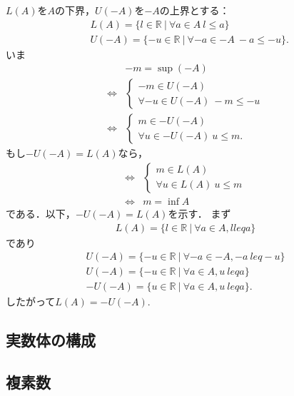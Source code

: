 \subsubsection{}
\begin{ans}
    $L(A)$を$A$の下界，$U(-A)$を$-A$の上界とする：
    \begin{align*}
        & L(A) = \{ l \in \mathbb{R} ~ | ~ \forall a \in A ~ l \leq a \}\\
        & U(-A) = \{ -u \in \mathbb{R} ~ | ~ \forall -a \in -A ~ -a \leq -u \}.
    \end{align*}
    いま
    \begin{align*}
        & -m = \sup (-A)\\
        \Leftrightarrow & \begin{cases}
            -m \in U(-A)\\
            \forall -u \in U(-A) ~ -m \leq -u
        \end{cases}\\
        \Leftrightarrow & \begin{cases}
            m \in -U(-A)\\
            \forall u \in -U(-A) ~ u \leq m.
        \end{cases}
    \end{align*}
    もし$-U(-A) = L(A)$なら，
    \begin{align*}
        \Leftrightarrow & \begin{cases}
            m \in L(A)\\
            \forall u \in L(A) ~ u \leq m
        \end{cases}\\
        \Leftrightarrow & m = \inf A
    \end{align*}
    である．以下，$-U(-A) = L(A)$を示す．
    まず
    \begin{align*}
        L(A) = \{l \in \mathbb{R} ~ | ~ \forall a \in A, l leq a\}
    \end{align*}
    であり
    \begin{align}
        U(-A) = \{-u \in \mathbb{R} ~ | ~ \forall -a \in -A, -a\ leq -u\}\\
        U(-A) = \{-u \in \mathbb{R} ~ | ~ \forall a \in A, u\ leq a\}\\
        -U(-A) = \{u \in \mathbb{R} ~ | ~ \forall a \in A, u\ leq a\}.
    \end{align}
    したがって$L(A) = -U(-A)$.
\end{ans}


\subsection{実数体の構成}
\subsection{複素数}